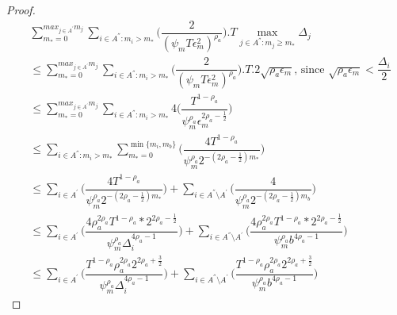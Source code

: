 \begin{proof}
\begin{align*}
&\sum_{m_{*}=0}^{max_{j\in A^{'}}m_{j}}\sum_{i\in A^{''}:m_{i}>m_{*}}\bigg(\dfrac{2}{(\psi_{m}T\epsilon_{m}^{2})^{\rho_{a}}} \bigg).T\max_{j\in A^{''}:m_{j}\geq m_{*}}{\Delta}_{j}\\
&\leq\sum_{m_{*}=0}^{max_{j\in A^{'}}m_{j}}\sum_{i\in A^{''}:m_{i}>m_{*}}\bigg(\dfrac{2}{(\psi_{m}T\epsilon_{m}^{2})^{\rho_{a}}} \bigg).T.2\sqrt{\rho_{a}\epsilon_{m}}\text{, since } \sqrt{\rho_{a}\epsilon_{m}}<\dfrac{\Delta_{i}}{2}\\
&\leq\sum_{m_{*}=0}^{max_{j\in A^{'}}m_{j}}\sum_{i\in A^{''}:m_{i}>m_{*}}4\bigg(\dfrac{T^{1-\rho_{a}}}{\psi_{m}^{\rho_{a}}\epsilon_{m}^{2\rho_{a}-\frac{1}{2}}} \bigg)\\
&\leq\sum_{i\in A^{''}:m_{i}>m_{*}}\sum_{m_{*}=0}^{\min{\lbrace m_{i},m_{b}\rbrace}}\bigg(\dfrac{4T^{1-\rho_{a}}}{\psi_{m}^{\rho_{a}}2^{-(2\rho_{a}-\frac{1}{2})m_{*}}} \bigg)\\
&\leq\sum_{i\in A^{'}}\bigg(\dfrac{4T^{1-\rho_{a}}}{\psi_{m}^{\rho_{a}}2^{-(2\rho_{a}-\frac{1}{2})m_{*}}} \bigg)+\sum_{i\in A^{''}\setminus A^{'}}\bigg(\dfrac{4}{\psi_{m}^{\rho_{a}}2^{-(2\rho_{a}-\frac{1}{2})m_{b}}} \bigg)\\
&\leq\sum_{i\in A^{'}}\bigg(\dfrac{4\rho_{a}^{2\rho_{a}}T^{1-\rho_{a}}*2^{2\rho_{a}-\frac{1}{2}}}{\psi_{m}^{\rho_{a}}\Delta_{i}^{4\rho_{a}-1}} \bigg)+\sum_{i\in A^{''}\setminus A^{'}}\bigg(\dfrac{4\rho_{a}^{2\rho_{a}}T^{1-\rho_{a}}*2^{2\rho_{a}-\frac{1}{2}}}{\psi_{m}^{\rho_{a}}b^{4\rho_{a}-1}} \bigg)\\
&\leq\sum_{i\in A^{'}}\bigg(\dfrac{T^{1-\rho_{a}}\rho_{a}^{2\rho_{a}}2^{2\rho_{a}+\frac{3}{2}}}{\psi_{m}^{\rho_{a}}\Delta_{i}^{4\rho_{a}-1}} \bigg)+\sum_{i\in A^{''}\setminus A^{'}}\bigg(\dfrac{T^{1-\rho_{a}}\rho_{a}^{2\rho_{a}}2^{2\rho_{a}+\frac{3}{2}}}{\psi_{m}^{\rho_{a}}b^{4\rho_{a}-1}} \bigg)
\end{align*}

 


% 
 

 

% 
 

\end{proof}
